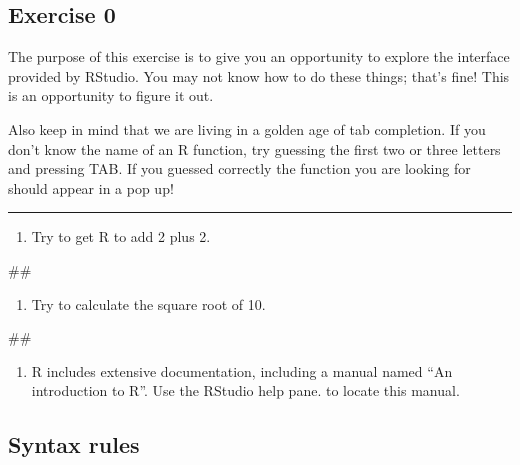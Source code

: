 \documentclass[]{book}
\newenvironment{Shaded}{\begin{snugshade}}{\end{snugshade}}
\newcommand{\NormalTok}[1]{#1}
\providecommand{\tightlist}{%
  \setlength{\itemsep}{0pt}\setlength{\parskip}{0pt}}
\begin{document}
\subsection{Exercise 0}\label{exercise-0}

The purpose of this exercise is to give you an opportunity to explore
the interface provided by RStudio. You may not know how to do these
things; that's fine! This is an opportunity to figure it out.

Also keep in mind that we are living in a golden age of tab completion.
If you don't know the name of an R function, try guessing the first two
or three letters and pressing TAB. If you guessed correctly the function
you are looking for should appear in a pop up!

\begin{center}\rule{0.5\linewidth}{\linethickness}\end{center}

\begin{enumerate}
\def\labelenumi{\arabic{enumi}.}
\tightlist
\item
  Try to get R to add 2 plus 2.
\end{enumerate}

\begin{Shaded}
\begin{Highlighting}[]
\NormalTok{##}
\end{Highlighting}
\end{Shaded}

\begin{enumerate}
\def\labelenumi{\arabic{enumi}.}
\setcounter{enumi}{1}
\tightlist
\item
  Try to calculate the square root of 10.
\end{enumerate}

\begin{Shaded}
\begin{Highlighting}[]
\NormalTok{##}
\end{Highlighting}
\end{Shaded}

\begin{enumerate}
\def\labelenumi{\arabic{enumi}.}
\setcounter{enumi}{2}
\tightlist
\item
  R includes extensive documentation, including a manual named ``An
  introduction to R''. Use the RStudio help pane. to locate this manual.
\end{enumerate}

\subsection{Syntax rules}\label{syntax-rules}
\end{document}
